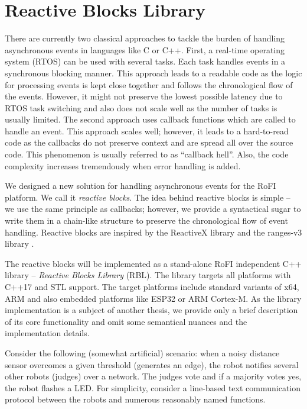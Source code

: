 \section{Reactive Blocks Library} \label{sec:rbl}

There are currently two classical approaches to tackle the burden of handling
asynchronous events in languages like C or C++. First, a real-time operating
system (RTOS) can be used with several tasks. Each task handles events in a
synchronous blocking manner. This approach leads to a readable code as the
logic for processing events is kept close together and follows the chronological
flow of the events. However, it might not preserve the lowest possible latency
due to RTOS task switching and also does not scale well as the number of tasks
is usually limited. The second approach uses callback functions which are called
to handle an event. This approach scales well; however, it leads to a
hard-to-read code as the callbacks do not preserve context and are spread all
over the source code. This phenomenon is usually referred to as ``callback
hell''. Also, the code complexity increases tremendously when error handling is
added.

We designed a new solution for handling asynchronous events for the RoFI
platform. We call it \emph{reactive blocks}. The idea behind reactive blocks is
simple -- we use the same principle as callbacks; however, we provide a
syntactical sugar to write them in a chain-like structure to preserve the
chronological flow of event handling. Reactive blocks are inspired by the
ReactiveX library \cite{noauthor_reactivex_nodate} and the ranges-v3 library
\cite{noauthor_range-v3_nodate}.

The reactive blocks will be implemented as a stand-alone RoFI independent C++
library -- \emph{Reactive Blocks Library} (RBL). The library targets all
platforms with C++17 and STL support. The target platforms include standard
variants of x64, ARM and also embedded platforms like ESP32 or ARM Cortex-M. As
the library implementation is a subject of another thesis, we provide only a
brief description of its core functionality and omit some semantical nuances and
the implementation details.

Consider the following (somewhat artificial) scenario: when a noisy distance
sensor overcomes a given threshold (generates an edge), the robot notifies
several other robots (judges) over a network. The judges vote and if a majority
votes yes, the robot flashes a LED. For simplicity, consider a line-based text
communication protocol between the robots and numerous reasonably named
functions.

